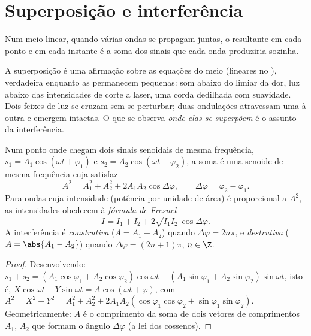 \section{Superposição e interferência}

\begin{theorem}[Superposição]\label{thm:b1:wave-propagation:superposition}
Num meio linear, quando várias ondas se propagam juntas, o
 resultante em cada ponto e em cada instante é a soma dos sinais que cada
onda produziria sozinha.
\end{theorem}
\admitted

\begin{remark}[Linearidade]\label{rem:b1:wave-propagation:linearity}
A superposição é uma afirmação sobre as equações do meio (lineares
no ), verdadeira enquanto as  permanecem pequenas: som abaixo do
limiar da dor, luz abaixo das intensidades de corte a laser, uma corda
dedilhada com suavidade. Dois feixes de luz se cruzam sem se perturbar;
duas ondulações atravessam uma à outra e emergem intactas. O que se
observa \emph{onde elas se superpõem} é o assunto da interferência.
\end{remark}

\begin{theorem}\label{thm:b1:wave-propagation:fresnel}
Num ponto onde chegam dois sinais senoidais de mesma frequência,
$s_1 = A_1\cos(\omega t + \varphi_1)$ e $s_2 = A_2\cos(\omega t + \varphi_2)$,
a soma é uma senoide de mesma frequência cuja  satisfaz
\[
A^2 = A_1^2 + A_2^2 + 2A_1A_2\cos\Delta\varphi,
\qquad \Delta\varphi = \varphi_2 - \varphi_1 .
\]
Para ondas cuja intensidade (potência por unidade de área) é proporcional a
$A^2$, as intensidades obedecem à \emph{fórmula de Fresnel}
\[
I = I_1 + I_2 + 2\sqrt{I_1 I_2}\,\cos\Delta\varphi .
\]
A interferência é \emph{construtiva} ($A = A_1 + A_2$) quando
$\Delta\varphi = 2n\pi$, e \emph{destrutiva} ($A = \abs{A_1 - A_2}$)
quando $\Delta\varphi = (2n + 1)\pi$, $n \in \Z$.
\end{theorem}

\begin{proof}
Desenvolvendo:
$s_1 + s_2 = (A_1\cos\varphi_1 + A_2\cos\varphi_2)\cos\omega t
- (A_1\sin\varphi_1 + A_2\sin\varphi_2)\sin\omega t$, isto é,
$X\cos\omega t - Y\sin\omega t = A\cos(\omega t + \varphi)$, com $A^2 = X^2 + Y^2 =
A_1^2 + A_2^2 + 2A_1A_2(\cos\varphi_1\cos\varphi_2 + \sin\varphi_1\sin\varphi_2)$.
Geometricamente: $A$ é o comprimento da soma de dois vetores de comprimentos
$A_1$, $A_2$ que formam o ângulo $\Delta\varphi$ (a lei dos cossenos).
\end{proof}

